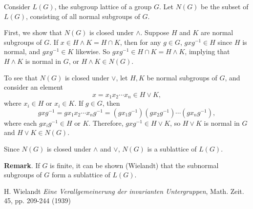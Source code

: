 \documentclass[12pt]{article}
\begin{document}
Consider $L(G)$, the subgroup lattice of a group $G$.  Let $N(G)$ be the subset of $L(G)$, consisting of all normal subgroups of $G$.  

First, we show that $N(G)$ is closed under $\wedge$.  Suppose $H$ and $K$ are normal subgroups of $G$.  If $x\in H\wedge K=H\cap K$, then for any $g\in G$, $gxg^{-1}\in H$ since $H$ is normal, and $gxg^{-1}\in K$ likewise.  So $gxg^{-1}\in H\cap K=H\wedge K$, implying that $H\wedge K$ is normal in $G$, or $H\wedge K \in N(G)$.


To see that $N(G)$ is closed under $\vee$, let $H,K$ be normal subgroups of $G$, and consider an element $$x=x_1x_2\cdots x_n\in H\vee K,$$
where $x_i\in H$ or $x_i\in K$.  If $g\in G$, then 
$$gxg^{-1}=gx_1x_2\cdots x_ng^{-1}=(gx_1g^{-1})(gx_2g^{-1})\cdots (gx_ng^{-1}),$$
where each $gx_ig^{-1}\in H$ or $K$.  Therefore, $gxg^{-1}\in H\vee K$, so $H\vee K$ is normal in $G$ and $H\vee K\in N(G)$.

Since $N(G)$ is closed under $\wedge$ and $\vee$, $N(G)$ is a sublattice of $L(G)$.

\textbf{Remark}.  If $G$ is finite, it can be shown (Wielandt) that the subnormal subgroups of $G$ form a sublattice of $L(G)$.

\begin{thebibliography}{9}
 H. Wielandt \emph{Eine Verallgemeinerung der invarianten Untergruppen}, Math. Zeit. 45, pp. 209-244 (1939)
\end{thebibliography}
\end{document}

